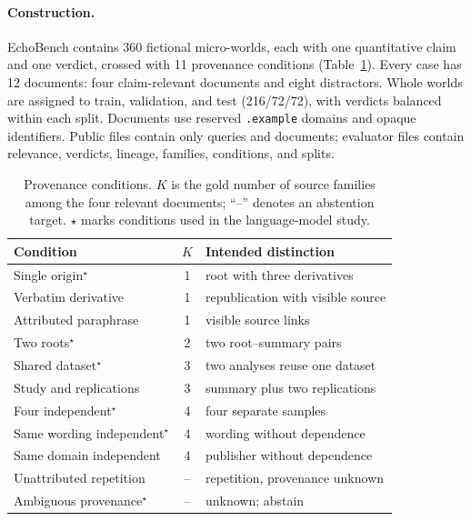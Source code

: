 \documentclass[11pt]{article}
\newcommand{\code}[1]{\texttt{#1}}
\begin{document}
\paragraph{Construction.}
EchoBench contains 360 fictional micro-worlds, each with one quantitative claim and one verdict,
crossed with 11 provenance conditions (Table~\ref{tab:conditions}). Every case has 12 documents:
four claim-relevant documents and eight distractors. Whole worlds are assigned to train,
validation, and test (216/72/72), with verdicts balanced within each split. Documents use reserved
\code{.example} domains and opaque identifiers. Public files contain only queries and documents;
evaluator files contain relevance, verdicts, lineage, families, conditions, and splits.

\begin{table}[t]
\caption{Provenance conditions. $K$ is the gold number of source families among the four
relevant documents; ``--'' denotes an abstention target. $\star$ marks conditions used in the
language-model study.}
\label{tab:conditions}
\centering\footnotesize
\setlength{\tabcolsep}{3pt}
\begin{tabular}{@{}lc>{\raggedright\arraybackslash}p{2.9cm}@{}}
\toprule
Condition & $K$ & Intended distinction\\
\midrule
Single origin$^\star$ & 1 & root with three derivatives\\
Verbatim derivative & 1 & republication with visible source\\
Attributed paraphrase & 1 & visible source links\\
Two roots$^\star$ & 2 & two root--summary pairs\\
Shared dataset$^\star$ & 3 & two analyses reuse one dataset\\
Study and replications & 3 & summary plus two replications\\
Four independent$^\star$ & 4 & four separate samples\\
Same wording independent$^\star$ & 4 & wording without dependence\\
Same domain independent & 4 & publisher without dependence\\
Unattributed repetition & -- & repetition, provenance unknown\\
Ambiguous provenance$^\star$ & -- & unknown; abstain\\
\bottomrule
\end{tabular}
\end{table}
\end{document}
